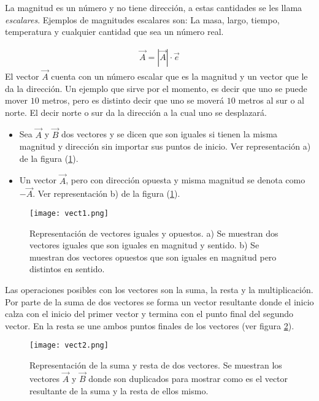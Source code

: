 La magnitud es un número y no tiene dirección, a estas cantidades se les llama \textit{escalares}. Ejemplos de magnitudes escalares son: La masa, largo, tiempo, temperatura y cualquier cantidad que sea un número real.

\begin{eqnarray}
\vec{A}=|\vec{A}|\cdot\vec{e}
\label{vector0}
\end{eqnarray}
El vector $\vec{A}$ cuenta con un número escalar que es la magnitud y un vector que le da la dirección. Un ejemplo que sirve por el momento, es decir que uno se puede mover $10$ metros, pero es distinto decir que uno se moverá $10$ metros al sur o al norte. El decir norte o sur da la dirección a la cual uno se desplazará.
\begin{itemize}
	\item Sea $\vec{A}$ y $\vec{B}$ dos vectores y se dicen que son iguales si tienen la misma magnitud y dirección sin importar sus puntos de inicio. Ver representación a) de la figura (\ref{vect1}).\\
	\item Un vector $\vec{A}$, pero con dirección opuesta y misma magnitud se denota como $-\vec{A}$. Ver representación b) de la figura (\ref{vect1}).
\end{itemize}

 \begin{center}
\begin{figure}[h!]
\centering
\texttt{[image: vect1.png]}
\caption[Representación 
Representación de vectores iguales y opuestos.]{Representación de vectores iguales y opuestos. a) Se muestran dos vectores iguales que son iguales en magnitud y sentido. b) Se muestran dos vectores opuestos que son iguales en magnitud pero distintos en sentido.} \label{vect1}
\end{figure}
\end{center}

Las operaciones posibles con los vectores son la suma, la resta y la multiplicación. Por parte de la suma de dos vectores se forma un vector resultante donde el inicio calza con el inicio del primer vector y termina con el punto final del segundo vector. En la resta se une ambos puntos finales de los vectores (ver figura \ref{vect2}).

 \begin{center}
\begin{figure}[h!]
\centering
\texttt{[image: vect2.png]}
\caption[Representación de la suma y resta de dos vectores.]{Representación de la suma y resta de dos vectores. Se muestran los vectores $\vec{A}$ y $\vec{B}$ donde son duplicados para mostrar como es el vector resultante de la suma y la resta de ellos mismo.} \label{vect2}
\end{figure}
\end{center}

